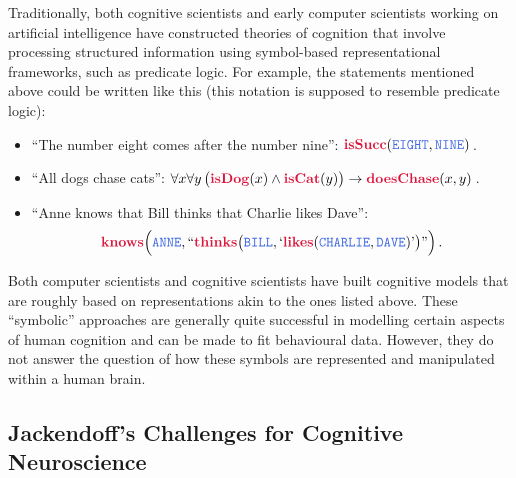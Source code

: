 \documentclass[10pt,letterpaper,oneside]{article}
\begin{document}
Traditionally, both cognitive scientists and early computer scientists working on artificial intelligence have constructed theories of cognition that involve processing structured information using symbol-based representational frameworks, such as predicate logic. For example, the statements mentioned above could be written like this (this notation is supposed to resemble predicate logic):
\newcommand{\Pred}[1]{\mathbf{\textcolor{Crimson}{#1}}}
\newcommand{\Obj}[1]{\mathtt{\textcolor{RoyalBlue}{#1}}}
\newcommand{\Fun}[1]{\mathit{\textcolor{ForestGreen}{#1}}}
\begin{itemize}
	\item \enquote{The number eight comes after the number nine}: $\Pred{isSucc}(\Obj{EIGHT}, \Obj{NINE})\,$.
	\item \enquote{All dogs chase cats}: $\forall x \forall y \, \big ( \Pred{isDog}(x) \wedge \Pred{isCat}(y) \big) \rightarrow \Pred{doesChase}(x, y)\,$.
	\item \enquote{Anne knows that Bill thinks that Charlie likes Dave}:$$\Pred{knows}\Big(\Obj{ANNE}, ``\Pred{thinks}\big(\Obj{BILL}, `\Pred{likes}(\Obj{CHARLIE}, \Obj{DAVE})\text{'}\big)\text{''}\Big)\,.$$
\end{itemize}
Both computer scientists and cognitive scientists have built cognitive models that are roughly based on representations akin to the ones listed above. These \enquote{symbolic} approaches are generally quite successful in modelling certain aspects of human cognition and can be made to fit behavioural data. However, they do not answer the question of how these symbols are represented and manipulated within a human brain.

\subsection{Jackendoff's Challenges for Cognitive Neuroscience}
\end{document}
